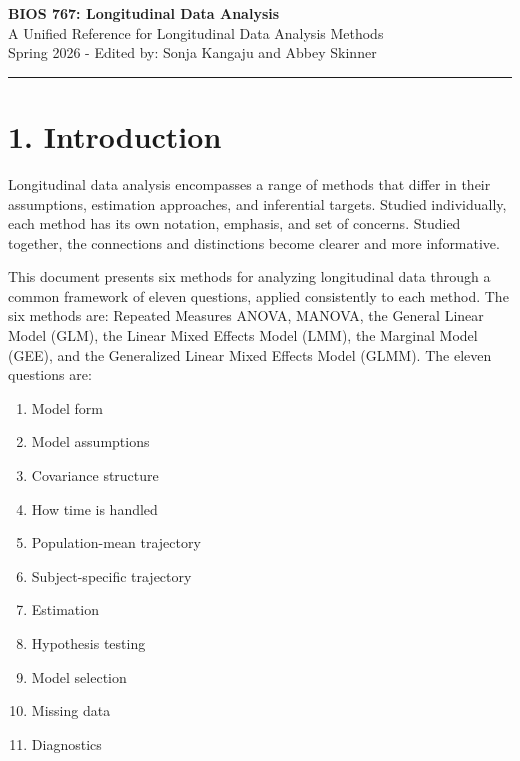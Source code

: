 \documentclass[11pt]{article}
\begin{document}
\begin{center}
{\LARGE \textbf{BIOS 767: Longitudinal Data Analysis}}\\[0.5em]
{\Large A Unified Reference for Longitudinal Data Analysis Methods}\\[0.5em]
{\normalsize Spring 2026 - Edited by: Sonja Kangaju and Abbey Skinner}
\end{center}

\vspace{1em}
\hrule
\vspace{1em}

\section*{1. Introduction}

Longitudinal data analysis encompasses a range of methods that differ in their assumptions, estimation approaches, and inferential targets. Studied individually, each method has its own notation, emphasis, and set of concerns. Studied together, the connections and distinctions become clearer and more informative.

This document presents six methods for analyzing longitudinal data through a common framework of eleven questions, applied consistently to each method. The six methods are: Repeated Measures ANOVA, MANOVA, the General Linear Model (GLM), the Linear Mixed Effects Model (LMM), the Marginal Model (GEE), and the Generalized Linear Mixed Effects Model (GLMM). The eleven questions are:

\begin{enumerate}[leftmargin=2em, itemsep=2pt]
  \item Model form
  \item Model assumptions
  \item Covariance structure
  \item How time is handled
  \item Population-mean trajectory
  \item Subject-specific trajectory
  \item Estimation
  \item Hypothesis testing
  \item Model selection
  \item Missing data
  \item Diagnostics
\end{enumerate}
\end{document}
